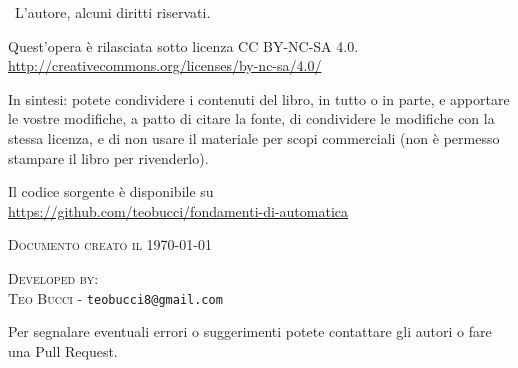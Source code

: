 
\textcopyright \ L'autore, alcuni diritti riservati.

Quest'opera è rilasciata sotto licenza CC BY-NC-SA 4.0.\\
\url{http://creativecommons.org/licenses/by-nc-sa/4.0/}

In sintesi: potete condividere i contenuti del libro, in tutto o in parte, e apportare le vostre modifiche, a patto di citare la fonte, di condividere le modifiche con la stessa licenza, e di non usare il materiale per scopi commerciali (non è permesso stampare il libro per rivenderlo).

Il codice sorgente \latex è disponibile su \\
\url{https://github.com/teobucci/fondamenti-di-automatica}


\textsc{Documento creato il \today}


\textsc{Developed by:}\\
\textsc{Teo Bucci} - \texttt{teobucci8@gmail.com}

Per segnalare eventuali errori o suggerimenti potete contattare gli autori o fare una Pull Request.

